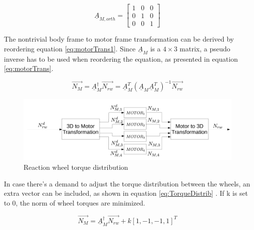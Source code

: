 \begin{equation}
\underline{A}_{M,orth}  = 
\begin{bmatrix}
1       & 0  &  0 \\
0       & 1  &  0  \\
0       & 0   & 1
\end{bmatrix} 
\label{eq:orthoMatrix}
\end{equation}



The nontrivial body frame to motor frame transformation can be derived by reordering equation  \ref{eq:motorTrans1}. Since $\underline{A}_{M} $ is a $ 4 \times 3 $ matrix, a pseudo inverse has to be used when reordering the equation, as presented in equation \ref{eq:motorTrans}. 

\begin{equation}
\label{eq:motorTrans}
\vec{N_{M}} =  \underline{A}_{M} ^\dagger \vec{N_{rw}}   =  \underline{A}_{M}^T  (\underline{A}_{M} \underline{A}_{M} ^T)^{-1} \vec{N_{rw}}
\end{equation}

\begin{figure}[H]
	\centering 
	\includegraphics[width=170mm]{figures/distribution}	
	\caption{Reaction wheel torque distribution}
	\label{fig:torqueDistribution}
\end{figure}



In case there's a demand to adjust the torque distribution between the wheels, an extra vector can be included, as shown in equation \ref{eq:TorqueDistrib}
\cite[equation 18.41-42]{SADC}. If k is set to 0, the norm of wheel torques are minimized.

\begin{equation}
\label{eq:TorqueDistrib}
 \vec{N_{M}} = \underline{A}^\dagger_{M} \vec{N_{rw}}  + k\left[1,-1,-1,1\right]^T
\end{equation}


